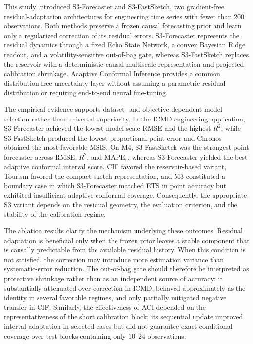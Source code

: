 \documentclass[review,number,sort&compress]{elsarticle}
\begin{document}
This study introduced S3-Forecaster and S3-FastSketch, two gradient-free residual-adaptation architectures for engineering time series with fewer than 200 observations. Both methods preserve a frozen causal forecasting prior and learn only a regularized correction of its residual errors. S3-Forecaster represents the residual dynamics through a fixed Echo State Network, a convex Bayesian Ridge readout, and a volatility-sensitive out-of-bag gate, whereas S3-FastSketch replaces the reservoir with a deterministic causal multiscale representation and projected calibration shrinkage. Adaptive Conformal Inference provides a common distribution-free uncertainty layer without assuming a parametric residual distribution or requiring end-to-end neural fine-tuning.

The empirical evidence supports dataset- and objective-dependent model selection rather than universal superiority. In the ICMD engineering application, S3-Forecaster achieved the lowest model-scale RMSE and the highest $R^2$, while S3-FastSketch produced the lowest proportional point error and Chronos obtained the most favorable MSIS. On M4, S3-FastSketch was the strongest point forecaster across RMSE, $R^2$, and $\mathrm{MAPE}_{\varepsilon}$, whereas S3-Forecaster yielded the best adaptive conformal interval score. CIF favored the reservoir-based variant, Tourism favored the compact sketch representation, and M3 constituted a boundary case in which S3-Forecaster matched ETS in point accuracy but exhibited insufficient adaptive conformal coverage. Consequently, the appropriate S3 variant depends on the residual geometry, the evaluation criterion, and the stability of the calibration regime.

The ablation results clarify the mechanism underlying these outcomes. Residual adaptation is beneficial only when the frozen prior leaves a stable component that is causally predictable from the available residual history. When this condition is not satisfied, the correction may introduce more estimation variance than systematic-error reduction. The out-of-bag gate should therefore be interpreted as protective shrinkage rather than as an independent source of accuracy: it substantially attenuated over-correction in ICMD, behaved approximately as the identity in several favorable regimes, and only partially mitigated negative transfer in CIF. Similarly, the effectiveness of ACI depended on the representativeness of the short calibration block; its sequential update improved interval adaptation in selected cases but did not guarantee exact conditional coverage over test blocks containing only $10$--$24$ observations.
\end{document}
